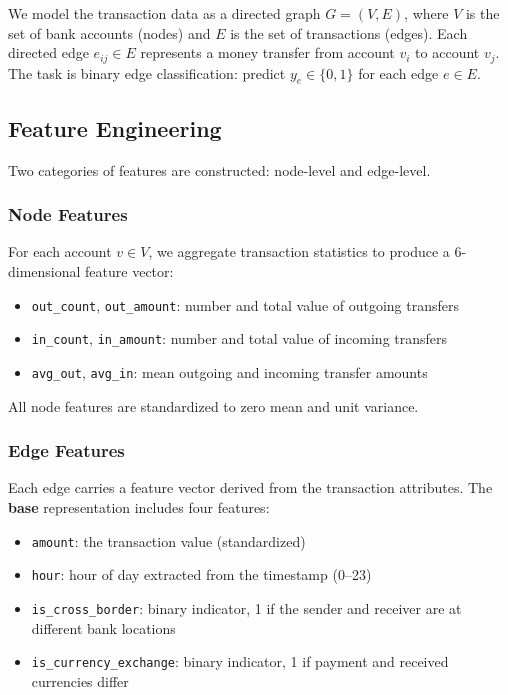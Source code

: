 \documentclass[conference]{IEEEtran}
\begin{document}
We model the transaction data as a directed graph $G = (V, E)$, where $V$ is the set of bank accounts (nodes) and $E$ is the set of transactions (edges). Each directed edge $e_{ij} \in E$ represents a money transfer from account $v_i$ to account $v_j$. The task is binary edge classification: predict $y_e \in \{0, 1\}$ for each edge $e \in E$.

\subsection{Feature Engineering}

Two categories of features are constructed: node-level and edge-level.

\subsubsection{Node Features}
For each account $v \in V$, we aggregate transaction statistics to produce a 6-dimensional feature vector:
\begin{itemize}
    \item \texttt{out\_count}, \texttt{out\_amount}: number and total value of outgoing transfers
    \item \texttt{in\_count}, \texttt{in\_amount}: number and total value of incoming transfers
    \item \texttt{avg\_out}, \texttt{avg\_in}: mean outgoing and incoming transfer amounts
\end{itemize}
All node features are standardized to zero mean and unit variance.

\subsubsection{Edge Features}
Each edge carries a feature vector derived from the transaction attributes. The \textbf{base} representation includes four features:
\begin{itemize}
    \item \texttt{amount}: the transaction value (standardized)
    \item \texttt{hour}: hour of day extracted from the timestamp (0--23)
    \item \texttt{is\_cross\_border}: binary indicator, 1 if the sender and receiver are at different bank locations
    \item \texttt{is\_currency\_exchange}: binary indicator, 1 if payment and received currencies differ
\end{itemize}
\end{document}
